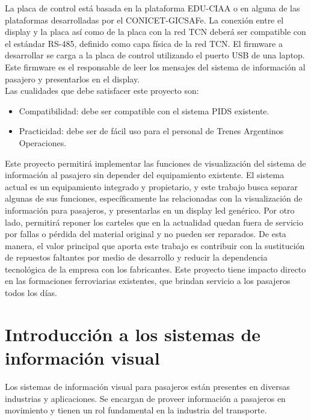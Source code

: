La placa de control está basada en la plataforma EDU-CIAA \citep{proyecto-ciaa} o en alguna de las plataformas desarrolladas por el CONICET-GICSAFe. La conexión entre el display y la placa así como de la placa con la red TCN deberá ser compatible con el estándar RS-485, definido como capa física de la red TCN. El
firmware a desarrollar se carga a la placa de control utilizando el puerto USB de una laptop. Este firmware es el responsable de leer los mensajes del sistema de información al pasajero y presentarlos en el display.\\

Las cualidades que debe satisfacer este proyecto son:
\begin{itemize}
\item Compatibilidad: debe ser compatible con el sistema PIDS existente.
\item Practicidad: debe ser de fácil uso para el personal de Trenes Argentinos Operaciones.
\end{itemize}

Este proyecto permitirá implementar las funciones de visualización del sistema de información al pasajero sin depender del equipamiento existente. El sistema actual es un equipamiento integrado y propietario, y este trabajo busca separar algunas de sus funciones, específicamente las relacionadas con la visualización de información para pasajeros, y presentarlas en un display led genérico. Por otro lado, permitirá reponer los carteles que en la actualidad quedan fuera de servicio por fallas o pérdida del material original y no pueden ser reparados. De esta manera, el valor principal que aporta este trabajo es contribuir con la sustitución de repuestos faltantes por medio de desarrollo y reducir la dependencia tecnológica de la empresa con los fabricantes. Este proyecto tiene impacto directo en las formaciones ferroviarias existentes, que brindan servicio a los pasajeros todos los días.\\

\section{Introducción a los sistemas de información visual}

Los sistemas de información visual para pasajeros están presentes en diversas industrias y aplicaciones. Se encargan de proveer información a pasajeros en  movimiento y tienen un rol fundamental en la industria del transporte.\\

